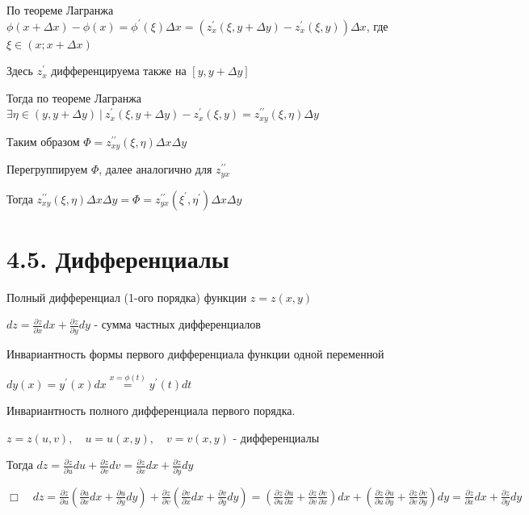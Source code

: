 \documentclass[12pt]{article}
\begin{document}
    По теореме Лагранжа $\displaystyle \phi(x + \Delta x) - \phi(x) = \phi^\prime(\xi) \Delta x = (z^\prime_x(\xi, y + \Delta y) - z^\prime_x(\xi, y)) \Delta x$, где $\displaystyle \xi \in (x; x + \Delta x)$

    Здесь $\displaystyle z^\prime_x$ дифференцируема также на $\displaystyle [y, y + \Delta y]$


    Тогда по теореме Лагранжа $\displaystyle \exists \eta \in (y, y + \Delta y) \ | \ z^\prime_x(\xi, y + \Delta y) - z^\prime_x(\xi, y) = z^{\prime\prime}_{xy} (\xi, \eta) \Delta y$

    Таким образом $\displaystyle \Phi = z^{\prime\prime}_{xy} (\xi, \eta) \Delta x \Delta y$

    Перегруппируем $\displaystyle \Phi$, далее аналогично для $\displaystyle z^{\prime\prime}_{yx}$

    Тогда $\displaystyle z^{\prime\prime}_{xy} (\xi, \eta) \Delta x \Delta y = \Phi = z^{\prime\prime}_{yx} (\xi^\prime, \eta^\prime) \Delta x \Delta y$

    \vspace{8mm}

    \section{4.5. Дифференциалы}
    
     Полный дифференциал (1-ого порядка) функции $\displaystyle z = z(x, y)$

    $\displaystyle dz = \frac{\partial z}{\partial x} dx + \frac{\partial z}{\partial y} dy$ - сумма частных дифференциалов

     Инвариантность формы первого дифференциала функции одной переменной

    $\displaystyle dy(x) = y^\prime(x)dx \stackrel{x = \phi(t)}{=} y^\prime(t)dt$

    \vspace{3mm}
    
    \Th Инвариантность полного дифференциала первого порядка.

    $\displaystyle z = z(u, v), \quad u = u(x, y), \quad v = v(x, y)$ - дифференциалы

    Тогда $\displaystyle dz = \frac{\partial z}{\partial u}du + \frac{\partial z}{\partial v} dv = \frac{\partial z}{\partial x} dx + \frac{\partial z}{\partial y} dy$

    $\displaystyle \Box \quad dz = \frac{\partial z}{\partial u} \left(\frac{\partial u}{\partial x} dx + \frac{\partial u}{\partial y} dy\right) +
    \frac{\partial z}{\partial v} \left(\frac{\partial v}{\partial x} dx + \frac{\partial v}{\partial y} dy\right) =
    \left(\frac{\partial z}{\partial u} \frac{\partial u}{\partial x} + \frac{\partial z}{\partial v} \frac{\partial v}{\partial x}\right) dx +
    \left(\frac{\partial z}{\partial u} \frac{\partial u}{\partial y} + \frac{\partial z}{\partial v} \frac{\partial v}{\partial y}\right) dy =
    \frac{\partial z}{\partial x} dx + \frac{\partial z}{\partial y} dy$
\end{document}
